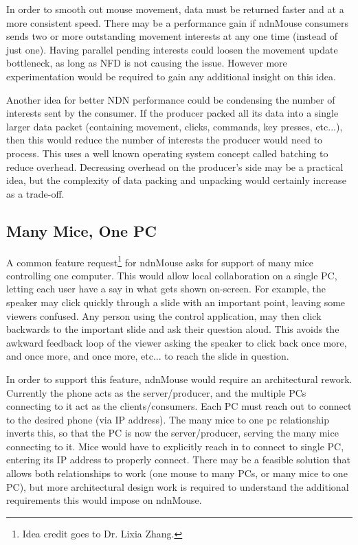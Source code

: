 \documentclass{sig-alternate}
\renewcommand\_{\textunderscore\allowbreak}  %
\begin{document}
In order to smooth out mouse movement, data must be returned faster and at a more consistent speed. There may be a performance gain if ndnMouse consumers sends two or more outstanding movement interests at any one time (instead of just one). Having parallel pending interests could loosen the movement update bottleneck, as long as NFD is not causing the issue. However more experimentation would be required to gain any additional insight on this idea.

Another idea for better NDN performance could be condensing the number of interests sent by the consumer. If the producer packed all its data into a single larger data packet (containing movement, clicks, commands, key presses, etc...), then this would reduce the number of interests the producer would need to process. This uses a well known operating system concept called batching to reduce overhead. Decreasing overhead on the producer's side may be a practical idea, but the complexity of data packing and unpacking would certainly increase as a trade-off.

\subsection{Many Mice, One PC}
A common feature request\footnote{Idea credit goes to Dr. Lixia Zhang.} for ndnMouse asks for support of many mice controlling one computer. This would allow local collaboration on a single PC, letting each user have a say in what gets shown on-screen. For example, the speaker may click quickly through a slide with an important point, leaving some viewers confused. Any person using the control application, may then click backwards to the important slide and ask their question aloud. This avoids the awkward feedback loop of the viewer asking the speaker to click back once more, and once more, and once more, etc... to reach the slide in question.

In order to support this feature, ndnMouse would require an architectural rework. Currently the phone acts as the server/producer, and the multiple PCs connecting to it act as the clients/consumers. Each PC must reach out to connect to the desired phone (via IP address). The many mice to one pc relationship inverts this, so that the PC is now the server/producer, serving the many mice connecting to it. Mice would have to explicitly reach in to connect to single PC, entering its IP address to properly connect. There may be a feasible solution that allows both relationships to work (one mouse to many PCs, or many mice to one PC), but more architectural design work is required to understand the additional requirements this would impose on ndnMouse.
\end{document}

